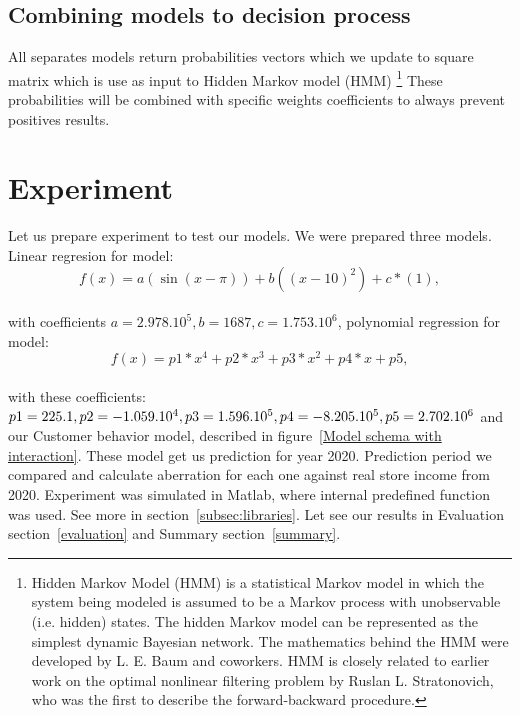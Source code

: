 \subsection{Combining models to decision process} \label{subsec:combining_models}
All separates models return probabilities vectors which we update to square matrix which is use as input to Hidden Markov model (HMM) \footnote{Hidden Markov Model (HMM) is a statistical Markov model
in which the system being modeled is assumed to be a Markov process with unobservable (i.e. hidden) states.
The hidden Markov model can be represented as the simplest dynamic Bayesian network.
The mathematics behind the HMM were developed by L. E. Baum and coworkers.
HMM is closely related to earlier work on the optimal nonlinear filtering problem by Ruslan L. Stratonovich,
who was the first to describe the forward-backward procedure.}
These probabilities will be combined with specific weights coefficients to always prevent positives results.
\\
\section{Experiment} \label{experiment}
Let us prepare experiment to test our models. We were prepared three models.
Linear regresion for model:\\
\begin{equation} \label{eq:40}
f(x) = a(\sin(x-\pi))+b((x-10)^2)+c*(1),
\end{equation}\\
with coefficients $a =2.978.10^5,b =1687,c = 1.753.10^6$, polynomial regression for model:\\
\begin{equation} \label{eq:41}
f(x) = p1*x^4 + p2*x^3 + p3*x^2 + p4*x + p5,
\end{equation}\\
with these coefficients: $p1 = 225.1, p2 = -1.059.10^4, p3 =1.596.10^5,\\
p4 = -8.205.10^5, p5 = 2.702.10^6$ and our Customer behavior model, described in figure~\ref{Model schema with interaction}.
These model get us prediction for year 2020.
Prediction period we compared and calculate aberration for each one against real store income from 2020.
Experiment was simulated in Matlab, where internal predefined function was used. See more in section~\ref{subsec:libraries}.
Let see our results in Evaluation section~\ref{evaluation} and Summary section~\ref{summary}.\\
